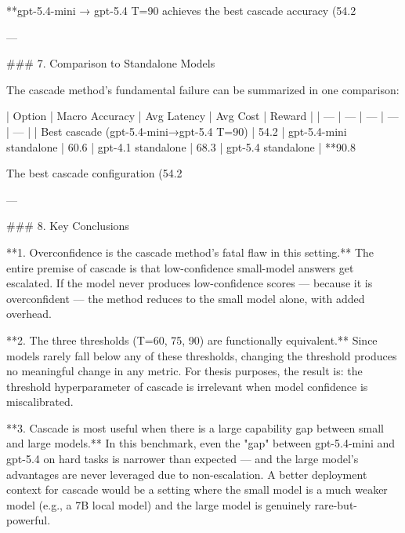 **gpt-5.4-mini → gpt-5.4 T=90 achieves the best cascade accuracy (54.2%

---

### 7. Comparison to Standalone Models

The cascade method's fundamental failure can be summarized in one comparison:

| Option | Macro Accuracy | Avg Latency | Avg Cost | Reward |
| --- | --- | --- | --- | --- |
| Best cascade (gpt-5.4-mini→gpt-5.4 T=90) | 54.2%
| gpt-5.4-mini standalone | 60.6%
| gpt-4.1 standalone | 68.3%
| gpt-5.4 standalone | **90.8%

The best cascade configuration (54.2%

---

### 8. Key Conclusions

**1. Overconfidence is the cascade method's fatal flaw in this setting.** The entire premise of cascade is that low-confidence small-model answers get escalated. If the model never produces low-confidence scores — because it is overconfident — the method reduces to the small model alone, with added overhead.

**2. The three thresholds (T=60, 75, 90) are functionally equivalent.** Since models rarely fall below any of these thresholds, changing the threshold produces no meaningful change in any metric. For thesis purposes, the result is: the threshold hyperparameter of cascade is irrelevant when model confidence is miscalibrated.

**3. Cascade is most useful when there is a large capability gap between small and large models.** In this benchmark, even the "gap" between gpt-5.4-mini and gpt-5.4 on hard tasks is narrower than expected — and the large model's advantages are never leveraged due to non-escalation. A better deployment context for cascade would be a setting where the small model is a much weaker model (e.g., a 7B local model) and the large model is genuinely rare-but-powerful.

